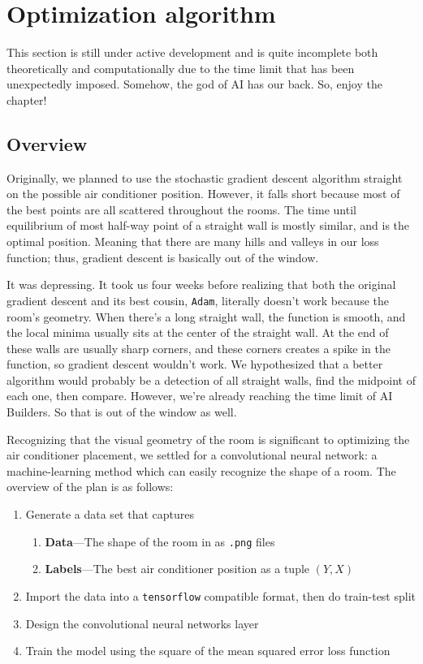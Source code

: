 \chapter{Optimization algorithm}

This section is still under active development and is quite incomplete both theoretically and computationally due to the time limit that has been unexpectedly imposed. Somehow, the god of AI has our back. So, enjoy the chapter!

\section{Overview}

Originally, we planned to use the stochastic gradient descent algorithm straight on the possible air conditioner position. However, it falls short because most of the best points are all scattered throughout the rooms. The time until equilibrium of most half-way point of a straight wall is mostly similar, and is the optimal position. Meaning that there are many hills and valleys in our loss function; thus, gradient descent is basically out of the window.

It was depressing. It took us four weeks before realizing that both the original gradient descent and its best cousin, \texttt{Adam}, literally doesn't work because the room's geometry. When there's a long straight wall, the function is smooth, and the local minima usually sits at the center of the straight wall. At the end of these walls are usually sharp corners, and these corners creates a spike in the function, so gradient descent wouldn't work. We hypothesized that a better algorithm would probably be a detection of all straight walls, find the midpoint of each one, then compare. However, we're already reaching the time limit of AI Builders. So that is out of the window as well. %

Recognizing that the visual geometry of the room is significant to optimizing the air conditioner placement, we settled for a convolutional neural network: a machine-learning method which can easily recognize the shape of a room. The overview of the plan is as follows:
\begin{enumerate}[noitemsep]
    \item Generate a data set that captures
          \begin{enumerate}[noitemsep]
              \item \textbf{Data}---The shape of the room in as \texttt{.png} files
              \item \textbf{Labels}---The best air conditioner position as a tuple $(Y, X)$
          \end{enumerate}
    \item Import the data into a \texttt{tensorflow} compatible format, then do train-test split
    \item Design the convolutional neural networks layer
    \item Train the model using the square of the mean squared error loss function
\end{enumerate}

